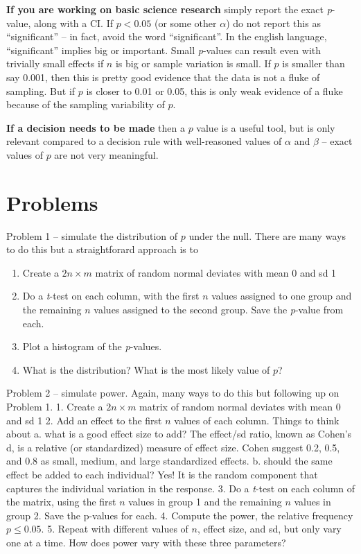 \documentclass[]{book}
\providecommand{\tightlist}{%
  \setlength{\itemsep}{0pt}\setlength{\parskip}{0pt}}
\begin{document}
\textbf{If you are working on basic science research} simply report the exact \emph{p}-value, along with a CI. If \(p < 0.05\) (or some other \(\alpha\)) do not report this as ``significant'' -- in fact, avoid the word ``significant''. In the english language, ``significant'' implies big or important. Small \emph{p}-values can result even with trivially small effects if \(n\) is big or sample variation is small. If \(p\) is smaller than say 0.001, then this is pretty good evidence that the data is not a fluke of sampling. But if \(p\) is closer to 0.01 or 0.05, this is only weak evidence of a fluke because of the sampling variability of \(p\).

\textbf{If a decision needs to be made} then a \(p\) value is a useful tool, but is only relevant compared to a decision rule with well-reasoned values of \(\alpha\) and \(\beta\) -- exact values of \(p\) are not very meaningful.

\hypertarget{problems}{%
\section{Problems}\label{problems}}

Problem 1 -- simulate the distribution of \(p\) under the null. There are many ways to do this but a straightforard approach is to

\begin{enumerate}
\def\labelenumi{\arabic{enumi}.}
\tightlist
\item
  Create a \(2n \times m\) matrix of random normal deviates with mean 0 and sd 1
\item
  Do a \emph{t}-test on each column, with the first \(n\) values assigned to one group and the remaining \(n\) values assigned to the second group. Save the \emph{p}-value from each.
\item
  Plot a histogram of the \emph{p}-values.
\item
  What is the distribution? What is the most likely value of \(p\)?
\end{enumerate}

Problem 2 -- simulate power. Again, many ways to do this but following up on Problem 1.
1. Create a \(2n \times m\) matrix of random normal deviates with mean 0 and sd 1
2. Add an effect to the first \(n\) values of each column. Things to think about
a. what is a good effect size to add? The effect/sd ratio, known as Cohen's d, is a relative (or standardized) measure of effect size. Cohen suggest 0.2, 0.5, and 0.8 as small, medium, and large standardized effects.
b. should the same effect be added to each individual? Yes! It is the random component that captures the individual variation in the response.
3. Do a \emph{t}-test on each column of the matrix, using the first \(n\) values in group 1 and the remaining \(n\) values in group 2. Save the p-values for each.
4. Compute the power, the relative frequency \(p \le 0.05\).
5. Repeat with different values of \(n\), effect size, and sd, but only vary one at a time. How does power vary with these three parameters?
\end{document}
